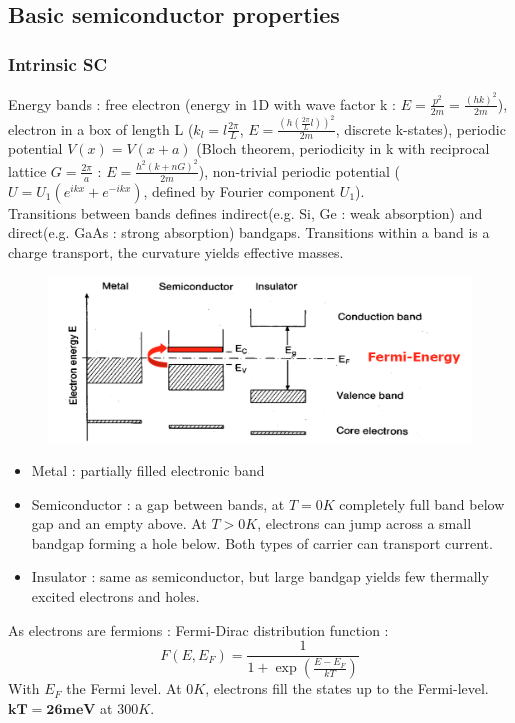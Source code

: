 \documentclass[../main.tex]{subfiles}
\begin{document}
\subsection{Basic semiconductor properties}
\subsubsection{Intrinsic SC}

Energy bands : free electron (energy in 1D with wave factor k : $E = \frac{p^2}{2m} = \frac{(hk)^2}{2m}$), electron in a box of length L ($k_l = l \frac{2\pi}{L}$, $E = \frac{(h(\frac{2\pi }{L}l))^2}{2m}$, discrete k-states), periodic potential $V(x) = V(x+a)$ (Bloch theorem, periodicity in k with reciprocal lattice $G = \frac{2\pi}{a}$ : $E = \frac{h^2 (k+nG)^2}{2m}$), non-trivial periodic potential ($U = U_1(e^{ikx} + e^{-ikx})$, defined by Fourier component $U_1$).\\

Transitions between bands defines indirect(e.g. Si, Ge : weak absorption) and direct(e.g. GaAs : strong absorption) bandgaps. Transitions within a band is a charge transport, the curvature yields effective masses. 

\begin{figure}[hbt!]
    \centering
    \includegraphics[width=0.7\linewidth]{IMAGES/PV/Screenshot from 2025-03-18 13-51-13.png}
\end{figure}

\begin{itemize}
    \item Metal : partially filled electronic band
    \item Semiconductor : a gap between bands, at $T=0K$ completely full band below gap and an empty above. At $T>0K$, electrons can jump across a small bandgap forming a hole below. Both types of carrier can transport current.
    \item Insulator : same as semiconductor, but large bandgap yields few thermally excited electrons and holes.
\end{itemize}


As electrons are fermions : Fermi-Dirac distribution function : \begin{equation}
    F(E,E_F)  = \frac{1}{1+\exp{(\frac{E-E_F}{kT})}}
\end{equation}
With $E_F$ the Fermi level. At $0K$, electrons fill the states up to the Fermi-level. $\mathbf{kT = 26meV}$ at $300K$.\\
\end{document}
